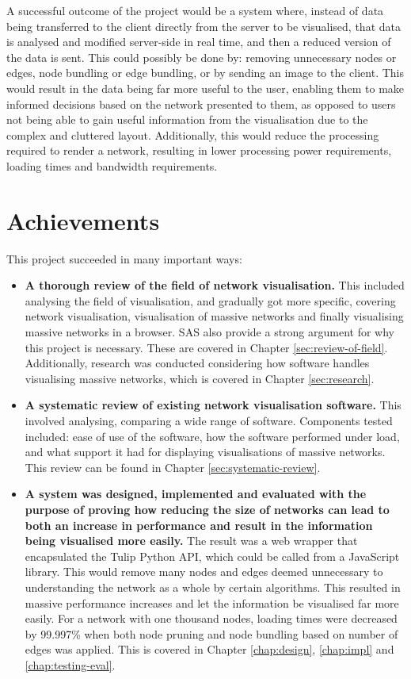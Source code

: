 \documentclass[../dissertation.tex]{subfiles}
\begin{document}
A successful outcome of the project would be a system where, instead of data being transferred to the client directly from the server to be visualised, that data is analysed and modified server-side in real time, and then a reduced version of the data is sent. This could possibly be done by: removing unnecessary nodes or edges, node bundling or edge bundling, or by sending an image to the client. This would result in the data being far more useful to the user, enabling them to make informed decisions based on the network presented to them, as opposed to users not being able to gain useful information from the visualisation due to the complex and cluttered layout. Additionally, this would reduce the processing required to render a network, resulting in lower processing power requirements, loading times and bandwidth requirements.

\section{Achievements}

This project succeeded in many important ways:

\begin{itemize}
    \item \textbf{A thorough review of the field of network visualisation.} This included analysing the field of visualisation, and gradually got more specific, covering network visualisation, visualisation of massive networks and finally visualising massive networks in a browser. SAS also provide a strong argument for why this project is necessary. These are covered in Chapter \ref{sec:review-of-field}. Additionally, research was conducted considering how software handles visualising massive networks, which is covered in Chapter \ref{sec:research}.
    \item \textbf{A systematic review of existing network visualisation software.} This involved analysing, comparing a wide range of software. Components tested included: ease of use of the software, how the software performed under load, and what support it had for displaying visualisations of massive networks. This review can be found in Chapter \ref{sec:systematic-review}.
    \item \textbf{A system was designed, implemented and evaluated with the purpose of proving how reducing the size of networks can lead to both an increase in performance and result in the information being visualised more easily.} The result was a web wrapper that encapsulated the Tulip Python API, which could be called from a JavaScript library. This would remove many nodes and edges deemed unnecessary to understanding the network as a whole by certain algorithms. This resulted in massive performance increases and let the information be visualised far more easily. For a network with one thousand nodes, loading times were decreased by 99.997\% when both node pruning and node bundling based on number of edges was applied. This is covered in Chapter \ref{chap:design}, \ref{chap:impl} and \ref{chap:testing-eval}.
\end{itemize}
\end{document}
